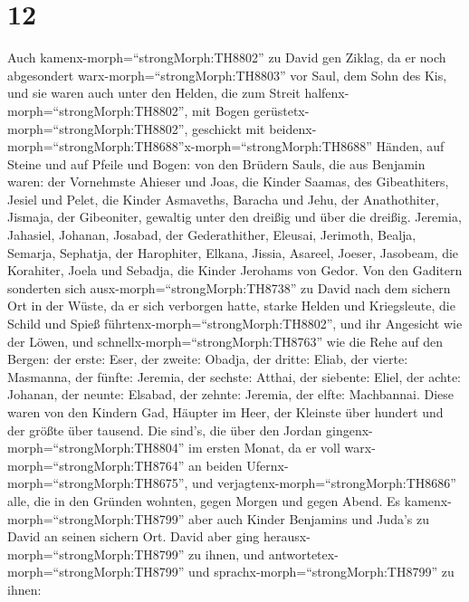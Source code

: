 \hypertarget{section-11}{%
\section{12}\label{section-11}}

 Auch kamenx-morph=``strongMorph:TH8802'' zu David gen
Ziklag, da er noch abgesondert warx-morph=``strongMorph:TH8803'' vor
Saul, dem Sohn des Kis, und sie waren auch unter den Helden, die zum
Streit halfenx-morph=``strongMorph:TH8802'',  mit Bogen
gerüstetx-morph=``strongMorph:TH8802'', geschickt mit
beidenx-morph=``strongMorph:TH8688''x-morph=``strongMorph:TH8688''
Händen, auf Steine und auf Pfeile und Bogen: von den Brüdern Sauls, die
aus Benjamin waren:  der Vornehmste Ahieser und Joas, die
Kinder Saamas, des Gibeathiters, Jesiel und Pelet, die Kinder Asmaveths,
Baracha und Jehu, der Anathothiter,  Jismaja, der
Gibeoniter, gewaltig unter den dreißig und über die dreißig. Jeremia,
Jahasiel, Johanan, Josabad, der Gederathither,  Eleusai,
Jerimoth, Bealja, Semarja, Sephatja, der Harophiter, 
Elkana, Jissia, Asareel, Joeser, Jasobeam, die Korahiter, 
Joela und Sebadja, die Kinder Jerohams von Gedor.  Von den
Gaditern sonderten sich ausx-morph=``strongMorph:TH8738'' zu David nach
dem sichern Ort in der Wüste, da er sich verborgen hatte, starke Helden
und Kriegsleute, die Schild und Spieß
führtenx-morph=``strongMorph:TH8802'', und ihr Angesicht wie der Löwen,
und schnellx-morph=``strongMorph:TH8763'' wie die Rehe auf den Bergen:
 der erste: Eser, der zweite: Obadja, der dritte: Eliab,
 der vierte: Masmanna, der fünfte: Jeremia, 
der sechste: Atthai, der siebente: Eliel,  der achte:
Johanan, der neunte: Elsabad,  der zehnte: Jeremia, der
elfte: Machbannai.  Diese waren von den Kindern Gad,
Häupter im Heer, der Kleinste über hundert und der größte über tausend.
 Die sind's, die über den Jordan
gingenx-morph=``strongMorph:TH8804'' im ersten Monat, da er voll
warx-morph=``strongMorph:TH8764'' an beiden
Ufernx-morph=``strongMorph:TH8675'', und
verjagtenx-morph=``strongMorph:TH8686'' alle, die in den Gründen
wohnten, gegen Morgen und gegen Abend.  Es
kamenx-morph=``strongMorph:TH8799'' aber auch Kinder Benjamins und
Juda's zu David an seinen sichern Ort.  David aber ging
herausx-morph=``strongMorph:TH8799'' zu ihnen, und
antwortetex-morph=``strongMorph:TH8799'' und
sprachx-morph=``strongMorph:TH8799'' zu ihnen:
